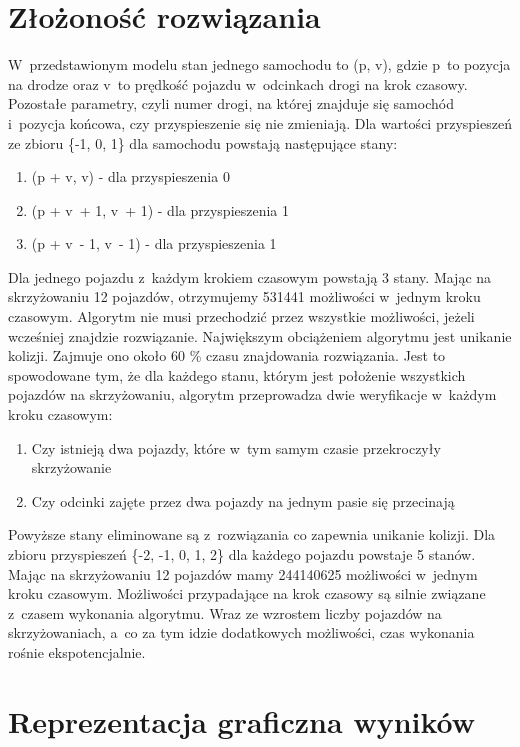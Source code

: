 \section{Złożoność rozwiązania}

W~przedstawionym modelu stan jednego samochodu to (p, v), gdzie p~to pozycja na drodze oraz v~to prędkość pojazdu w~odcinkach drogi na krok czasowy. Pozostałe parametry, czyli numer drogi, na której znajduje się samochód i~pozycja końcowa, czy przyspieszenie się nie zmieniają. Dla wartości przyspieszeń ze zbioru \{-1, 0, 1\} dla samochodu powstają następujące stany:
\begin{enumerate}
\item (p + v, v) - dla przyspieszenia 0
\item (p + v~+ 1, v~+ 1) - dla przyspieszenia 1
\item (p + v~- 1, v~- 1) - dla przyspieszenia 1
\end{enumerate}
Dla jednego pojazdu z~każdym krokiem czasowym powstają 3 stany. Mając na skrzyżowaniu 12 pojazdów, otrzymujemy 531441 możliwości w~jednym kroku czasowym. Algorytm nie musi przechodzić przez wszystkie możliwości, jeżeli wcześniej znajdzie rozwiązanie.
\newline
\indent
Największym obciążeniem algorytmu jest unikanie kolizji. Zajmuje ono około 60 \% czasu znajdowania rozwiązania. Jest to spowodowane tym, że dla każdego stanu, którym jest położenie wszystkich pojazdów na skrzyżowaniu, algorytm przeprowadza dwie weryfikacje w~każdym kroku czasowym:
\begin{enumerate}
\item Czy istnieją dwa pojazdy, które w~tym samym czasie przekroczyły skrzyżowanie
\item Czy odcinki zajęte przez dwa pojazdy na jednym pasie się przecinają
\end{enumerate}
Powyższe stany eliminowane są z~rozwiązania co zapewnia unikanie kolizji.
\newline
\indent
Dla zbioru przyspieszeń \{-2, -1, 0, 1, 2\} dla każdego pojazdu powstaje 5 stanów. Mając na skrzyżowaniu 12 pojazdów mamy 244140625 możliwości w~jednym kroku czasowym. Możliwości przypadające na krok czasowy są silnie związane z~czasem wykonania algorytmu. Wraz ze wzrostem liczby pojazdów na skrzyżowaniach, a~co za tym idzie dodatkowych możliwości, czas wykonania rośnie ekspotencjalnie.
\section{Reprezentacja graficzna wyników}

